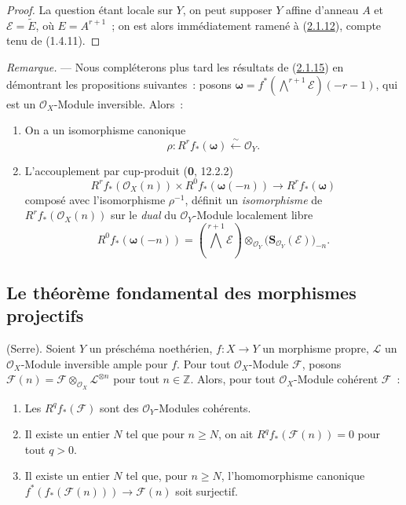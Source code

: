 \begin{proof}
La question étant locale sur $Y$, on peut supposer $Y$ affine d'anneau
$A$ et $\mathcal E=\widetilde E$, où $E=A^{r+1}$~; on est alors
immédiatement ramené à (\hyperref[III.2.1.12-fr]{2.1.12}), compte tenu de
(1.4.11).
\end{proof}

\begin{env}[2.1.16]
\label{III.2.1.16-fr}
\emph{Remarque.} --- Nous compléterons plus tard les résultats de
(\hyperref[III.2.1.15-fr]{2.1.15}) en démontrant les propositions
suivantes~: posons
$\boldsymbol\omega=f^*(\bigwedge^{r+1}\mathcal E)(-r-1)$,
qui est un $\mathcal O_X$-Module inversible. Alors~:
\begin{enumerate}
\item[{\rm(i)}] On a un isomorphisme canonique
\begin{equation}
\label{III.2.1.16.1-fr}
\tag{2.1.16.1}
\rho:R^rf_*(\boldsymbol\omega)\xleftarrow{\sim}\mathcal O_Y.
\end{equation}
\item[{\rm(ii)}] L'accouplement par cup-produit (\textbf{0}, 12.2.2)
\begin{equation}
\label{III.2.1.16.2-fr}
\tag{2.1.16.2}
R^rf_*(\mathcal O_X(n))\times R^0f_*(\boldsymbol\omega(-n))
\longrightarrow R^rf_*(\boldsymbol\omega)
\end{equation}
composé avec l'isomorphisme $\rho^{-1}$, définit un \emph{isomorphisme}
de $R^rf_*(\mathcal O_X(n))$ sur le \emph{dual} du $\mathcal O_Y$-Module
localement libre
\[
R^0f_*(\boldsymbol\omega(-n))
=\left(\bigwedge^{r+1}\mathcal E\right)
\otimes_{\mathcal O_Y}\bigl(\mathbf S_{\mathcal O_Y}(\mathcal E)\bigr)_{-n}.
\]
\end{enumerate}
\end{env}
\subsection{Le théorème fondamental des morphismes projectifs}
\label{subsection:III.2.2-fr}

\begin{theorem}[2.2.1]
\label{III.2.2.1-fr}
(Serre). Soient $Y$ un préschéma noethérien, $f:X\to Y$ un morphisme
propre, $\mathcal L$ un $\mathcal O_X$-Module inversible ample pour $f$.
Pour tout $\mathcal O_X$-Module $\mathcal F$, posons
$\mathcal F(n)=\mathcal F\otimes_{\mathcal O_X}\mathcal L^{\otimes n}$
pour tout $n\in\mathbb Z$.
Alors, pour tout $\mathcal O_X$-Module cohérent $\mathcal F$~:
\begin{enumerate}
\item[{\rm(i)}] Les $R^qf_*(\mathcal F)$ sont des
$\mathcal O_Y$-Modules cohérents.
\item[{\rm(ii)}] Il existe un entier $N$ tel que pour $n\geq N$, on ait
$R^qf_*(\mathcal F(n))=0$ pour tout $q>0$.
\item[{\rm(iii)}] Il existe un entier $N$ tel que, pour $n\geq N$,
l'homomorphisme canonique
$f^*(f_*(\mathcal F(n)))\longrightarrow\mathcal F(n)$
soit surjectif.
\end{enumerate}
\end{theorem}

